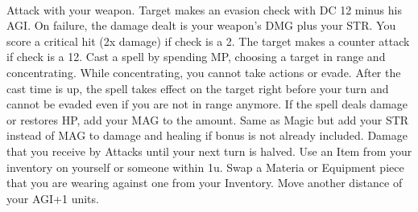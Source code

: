 \documentclass[a4paper, titlepage, 11pt, twocolumn] {article}
\begin{document}
{	%
	\begin{multicols}{2}
	\columnbreak
	\end{multicols}
	{\vspace*{-0.4cm}\ofcsrulea}\vspace*{-0.9cm}\\
	\begin{multicols}{2}
	\hspace*{-0.3cm}
	\parbox{1.03\columnwidth}{
		\scriptsize
		\hfill{}\hfill\ofrow
		 Attack with your weapon.
		Target makes an evasion check with DC 12 minus his AGI.
		On failure, the damage dealt is your weapon's DMG plus your STR.
		You score a critical hit (2x damage) if check is a 2.
		The target makes a counter attack if check is a 12.\ofrow
		 Cast a spell by spending MP, choosing a target in range and concentrating.
		While concentrating, you cannot take actions or evade. 
		After the cast time is up, the spell takes effect on the target right before your turn and cannot be evaded even if you are not in range anymore.
		If the spell deals damage or restores HP, add your MAG to the amount.\ofrow
		Same as Magic but add your STR instead of MAG to damage and healing if bonus is not already included.\ofrow
		 Damage that you receive by Attacks until your next turn is halved. \ofrow
		 Use an Item from your inventory on yourself or someone within 1u.\ofrow
		 Swap a Materia or Equipment piece that you are wearing against one from your Inventory.\ofrow
		 Move another distance of your AGI+1 units.
	}
	\columnbreak\\
	\parbox{1.03\columnwidth}{
		\scriptsize	
		\hfill{}\hfill\ofrow
}
\end{multicols}}
\end{document}
